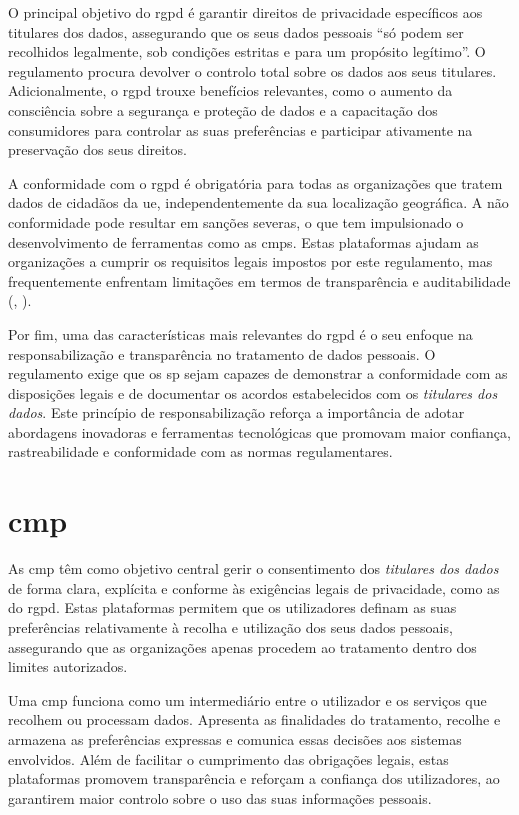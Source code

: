 O principal objetivo do \acrshort{rgpd} é garantir direitos de privacidade específicos aos titulares dos dados, assegurando que os seus dados pessoais “só podem ser recolhidos legalmente, sob condições estritas e para um propósito legítimo”. O regulamento procura devolver o controlo total sobre os dados aos seus titulares. Adicionalmente, o \acrshort{rgpd} trouxe benefícios relevantes, como o aumento da consciência sobre a segurança e proteção de dados e a capacitação dos consumidores para controlar as suas preferências e participar ativamente na preservação dos seus direitos.

A conformidade com o \acrshort{rgpd} é obrigatória para todas as organizações que tratem dados de cidadãos da \acrshort{ue}, independentemente da sua localização geográfica. A não conformidade pode resultar em sanções severas, o que tem impulsionado o desenvolvimento de ferramentas como as \acrshort{cmp}s. Estas plataformas ajudam as organizações a cumprir os requisitos legais impostos por este regulamento, mas frequentemente enfrentam limitações em termos de transparência e auditabilidade (\cite{ribeiro2025assessing}, \cite{ramos2019privacy}).

Por fim, uma das características mais relevantes do \acrshort{rgpd} é o seu enfoque na responsabilização e transparência no tratamento de dados pessoais. O regulamento exige que os \acrfull{sp} sejam capazes de demonstrar a conformidade com as disposições legais e de documentar os acordos estabelecidos com os \textit{titulares dos dados}. Este princípio de responsabilização reforça a importância de adotar abordagens inovadoras e ferramentas tecnológicas que promovam maior confiança, rastreabilidade e conformidade com as normas regulamentares.

\newpage

\section{\texorpdfstring{\acrfull{cmp}}{CMP}}

As \acrfull{cmp} têm como objetivo central gerir o consentimento dos \textit{titulares dos dados} de forma clara, explícita e conforme às exigências legais de privacidade, como as do \acrshort{rgpd}. Estas plataformas permitem que os utilizadores definam as suas preferências relativamente à recolha e utilização dos seus dados pessoais, assegurando que as organizações apenas procedem ao tratamento dentro dos limites autorizados. 

Uma \acrshort{cmp} funciona como um intermediário entre o utilizador e os serviços que recolhem ou processam dados. Apresenta as finalidades do tratamento, recolhe e armazena as preferências expressas e comunica essas decisões aos sistemas envolvidos. Além de facilitar o cumprimento das obrigações legais, estas plataformas promovem transparência e reforçam a confiança dos utilizadores, ao garantirem maior controlo sobre o uso das suas informações pessoais.

